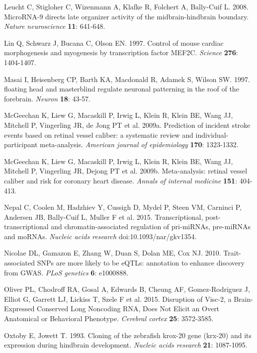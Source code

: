 \documentclass[]{article}
\begin{document}
\protect\hypertarget{_ENREF_16}{}{}Leucht C, Stigloher C, Wizenmann A,
Klafke R, Folchert A, Bally-Cuif L. 2008. MicroRNA-9 directs late
organizer activity of the midbrain-hindbrain boundary. \emph{Nature
neuroscience} \textbf{11}: 641-648.

\protect\hypertarget{_ENREF_17}{}{}Lin Q, Schwarz J, Bucana C, Olson EN.
1997. Control of mouse cardiac morphogenesis and myogenesis by
transcription factor MEF2C. \emph{Science} \textbf{276}: 1404-1407.

\protect\hypertarget{_ENREF_18}{}{}Masai I, Heisenberg CP, Barth KA,
Macdonald R, Adamek S, Wilson SW. 1997. floating head and masterblind
regulate neuronal patterning in the roof of the forebrain. \emph{Neuron}
\textbf{18}: 43-57.

\protect\hypertarget{_ENREF_19}{}{}McGeechan K, Liew G, Macaskill P,
Irwig L, Klein R, Klein BE, Wang JJ, Mitchell P, Vingerling JR, de Jong
PT et al. 2009a. Prediction of incident stroke events based on retinal
vessel caliber: a systematic review and individual-participant
meta-analysis. \emph{American journal of epidemiology} \textbf{170}:
1323-1332.

\protect\hypertarget{_ENREF_20}{}{}McGeechan K, Liew G, Macaskill P,
Irwig L, Klein R, Klein BE, Wang JJ, Mitchell P, Vingerling JR, Dejong
PT et al. 2009b. Meta-analysis: retinal vessel caliber and risk for
coronary heart disease. \emph{Annals of internal medicine} \textbf{151}:
404-413.

\protect\hypertarget{_ENREF_21}{}{}Nepal C, Coolen M, Hadzhiev Y,
Cussigh D, Mydel P, Steen VM, Carninci P, Andersen JB, Bally-Cuif L,
Muller F et al. 2015. Transcriptional, post-transcriptional and
chromatin-associated regulation of pri-miRNAs, pre-miRNAs and moRNAs.
\emph{Nucleic acids research} doi:10.1093/nar/gkv1354.

\protect\hypertarget{_ENREF_22}{}{}Nicolae DL, Gamazon E, Zhang W, Duan
S, Dolan ME, Cox NJ. 2010. Trait-associated SNPs are more likely to be
eQTLs: annotation to enhance discovery from GWAS. \emph{PLoS genetics}
\textbf{6}: e1000888.

\protect\hypertarget{_ENREF_23}{}{}Oliver PL, Chodroff RA, Gosal A,
Edwards B, Cheung AF, Gomez-Rodriguez J, Elliot G, Garrett LJ, Lickiss
T, Szele F et al. 2015. Disruption of Visc-2, a Brain-Expressed
Conserved Long Noncoding RNA, Does Not Elicit an Overt Anatomical or
Behavioral Phenotype. \emph{Cerebral cortex} \textbf{25}: 3572-3585.

\protect\hypertarget{_ENREF_24}{}{}Oxtoby E, Jowett T. 1993. Cloning of
the zebrafish krox-20 gene (krx-20) and its expression during hindbrain
development. \emph{Nucleic acids research} \textbf{21}: 1087-1095.
\end{document}
